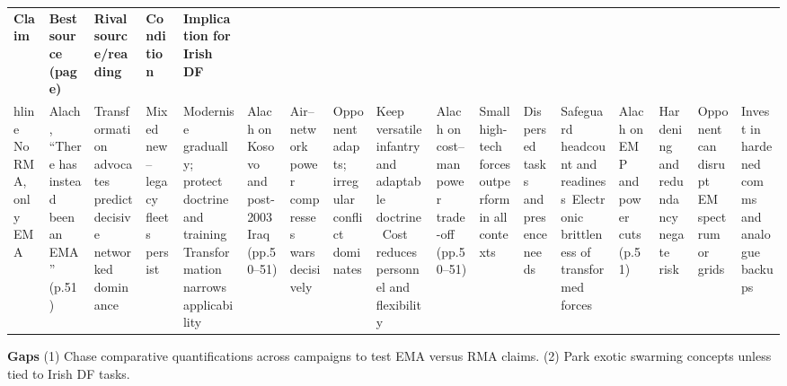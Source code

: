 \usepackage{array}
\begin{tabular}{p{3.2cm}p{4.2cm}p{3.6cm}p{3.2cm}p{4.2cm}}
	\textbf{Claim} & \textbf{Best source (page)} & \textbf{Rival source/reading} & \textbf{Condition} & \textbf{Implication for Irish DF}\\hline
	No RMA, only EMA & Alach, “There has instead been an EMA” (p.51) & Transformation advocates predict decisive networked dominance & Mixed new–legacy fleets persist & Modernise gradually; protect doctrine and training\
	Transformation narrows applicability & Alach on Kosovo and post-2003 Iraq (pp.50–51) & Air–network power compresses wars decisively & Opponent adapts; irregular conflict dominates & Keep versatile infantry and adaptable doctrine\
	Cost reduces personnel and flexibility & Alach on cost–manpower trade-off (pp.50–51) & Small high-tech forces outperform in all contexts & Dispersed tasks and presence needs & Safeguard headcount and readiness\
	Electronic brittleness of transformed forces & Alach on EMP and power cuts (p.51) & Hardening and redundancy negate risk & Opponent can disrupt EM spectrum or grids & Invest in hardened comms and analogue backups\
\end{tabular}

\textbf{Gaps}
(1) Chase comparative quantifications across campaigns to test EMA versus RMA claims.
(2) Park exotic swarming concepts unless tied to Irish DF tasks.


\parencite{BACHMANN_2023a_OODA}
